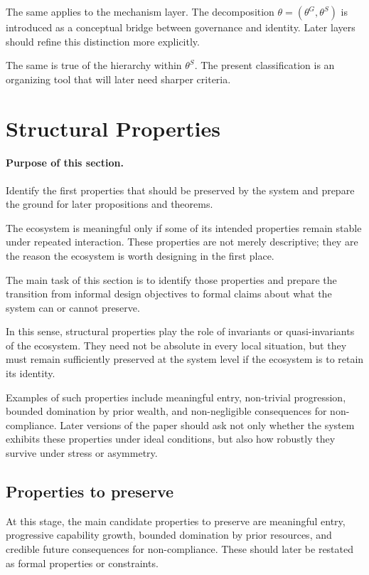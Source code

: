 \documentclass[11pt]{article}
\begin{document}
The same applies to the mechanism layer. The decomposition \(\theta = (\theta^{G}, \theta^{S})\) is introduced as a conceptual bridge between governance and identity. Later layers should refine this distinction more explicitly.

The same is true of the hierarchy within \(\theta^{S}\). The present classification is an organizing tool that will later need sharper criteria.

\section{Structural Properties}

\paragraph{Purpose of this section.}
Identify the first properties that should be preserved by the system and prepare the ground for later propositions and theorems.

The ecosystem is meaningful only if some of its intended properties remain stable under repeated interaction. These properties are not merely descriptive; they are the reason the ecosystem is worth designing in the first place.

The main task of this section is to identify those properties and prepare the transition from informal design objectives to formal claims about what the system can or cannot preserve.

In this sense, structural properties play the role of invariants or quasi-invariants of the ecosystem. They need not be absolute in every local situation, but they must remain sufficiently preserved at the system level if the ecosystem is to retain its identity.

Examples of such properties include meaningful entry, non-trivial progression, bounded domination by prior wealth, and non-negligible consequences for non-compliance. Later versions of the paper should ask not only whether the system exhibits these properties under ideal conditions, but also how robustly they survive under stress or asymmetry.

\subsection{Properties to preserve}

At this stage, the main candidate properties to preserve are meaningful entry, progressive capability growth, bounded domination by prior resources, and credible future consequences for non-compliance. These should later be restated as formal properties or constraints.
\end{document}
